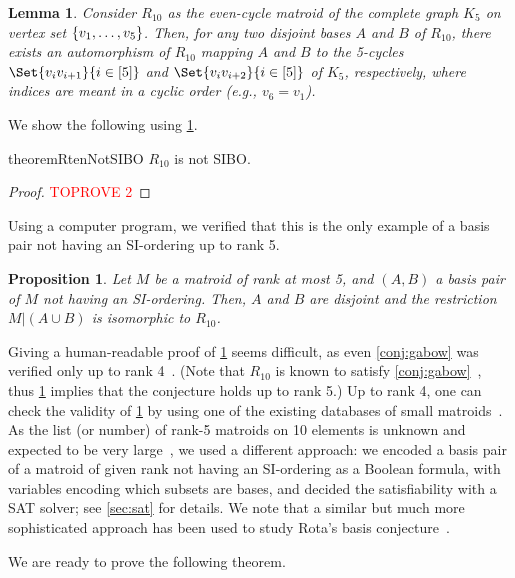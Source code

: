 \documentclass{article}
\DeclarePairedDelimiter{\set}{\{}{\}}
\newtheorem{lemma}[theorem]{Lemma}
\newtheorem{proposition}[theorem]{Proposition}
\theoremstyle{definition}
\begin{document}
\begin{lemma} \label{lem:r10auto}
	Consider $R_{10}$ as the even-cycle matroid of the complete graph $K_5$ on vertex set $\set{v_1,\dots, v_5}$.
	Then, for any two disjoint bases $A$ and $B$ of $R_{10}$, there exists an automorphism of $R_{10}$ mapping $A$ and $B$ to the 5-cycles $\Set{v_iv_{i+1}}{i \in [5]}$ and  $\Set{v_iv_{i+2}}{i \in [5]}$ of $K_5$, respectively, where indices are meant in a cyclic order (e.g., $v_6 = v_1$).
\end{lemma}

We show the following using \cref{lem:r10auto}.

\begin{restatable}{theorem}{RtenNotSIBO}\label{thm:R10notSIBO}
    $R_{10}$ is not SIBO.
\end{restatable}

\begin{proof}\textcolor{red}{TOPROVE 2}\end{proof}

Using a computer program, we verified that this is the only example of a basis pair not having an SI-ordering up to rank 5.

\begin{proposition} \label{prop:sat}
Let $M$ be a matroid of rank at most 5, and $(A,B)$ a basis pair of $M$ not having an SI-ordering.
Then, $A$ and $B$ are disjoint and the restriction $M|(A\cup B)$ is isomorphic to $R_{10}$.
\end{proposition}

Giving a human-readable proof of \cref{prop:sat} seems difficult, as even \cref{conj:gabow} was verified only up to rank 4~\cite{kotlar2013serial}. (Note that $R_{10}$ is known to satisfy \cref{conj:gabow}~\cite{berczi2023reconfiguration}, thus \cref{prop:sat} implies that the conjecture holds up to rank 5.)
Up to rank 4, one can check the validity of \cref{prop:sat} by using one of the existing databases of small matroids~\cite{mayhew2008nine}. 
As the list (or number) of rank-5 matroids on 10 elements is unknown and expected to be very large~\cite{mayhew2008nine}, we used a different approach: we encoded a basis pair of a matroid of given rank not having an SI-ordering as a Boolean formula, with variables encoding which subsets are bases, and decided the satisfiability with a SAT solver; see \cref{sec:sat} for details. We note that a similar but much more sophisticated approach has been used to study Rota's basis conjecture~\cite{kirchweger2022sat}.

We are ready to prove the following theorem.
\end{document}
